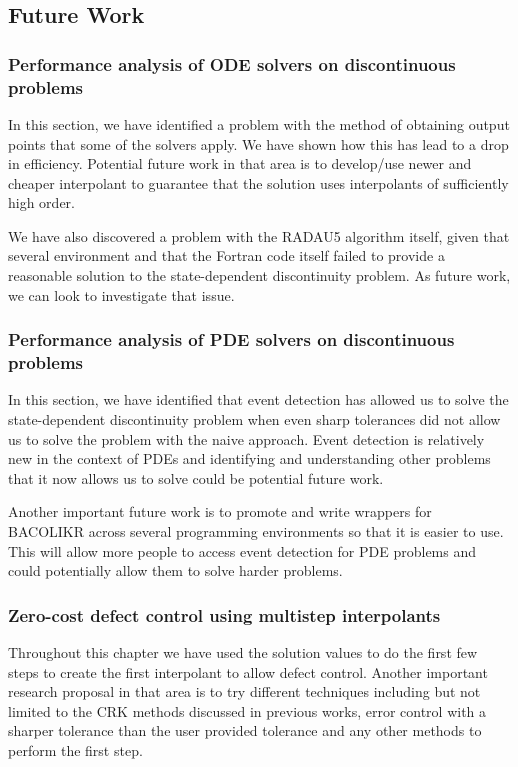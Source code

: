 \documentclass{article}
\begin{document}
\subsection{Future Work}
\subsubsection{Performance analysis of ODE solvers on discontinuous problems}
In this section, we have identified a problem with the method of obtaining output points that some of the solvers apply. We have shown how this has lead to a drop in efficiency. Potential future work in that area is to develop/use newer and cheaper interpolant to guarantee that the solution uses interpolants of sufficiently high order.

We have also discovered a problem with the RADAU5 algorithm itself, given that several environment and that the Fortran code itself failed to provide a reasonable solution to the state-dependent discontinuity problem. As future work, we can look to investigate that issue. 

\subsubsection{Performance analysis of PDE solvers on discontinuous problems}
In this section, we have identified that event detection has allowed us to solve the state-dependent discontinuity problem when even sharp tolerances did not allow us to solve the problem with the naive approach. Event detection is relatively new in the context of PDEs and identifying and understanding other problems that it now allows us to solve could be potential future work.

Another important future work is to promote and write wrappers for BACOLIKR across several programming environments so that it is easier to use. This will allow more people to access event detection for PDE problems and could potentially allow them to solve harder problems. 


\subsubsection{Zero-cost defect control using multistep interpolants}
Throughout this chapter we have used the solution values to do the first few steps to create the first interpolant to allow defect control. Another important research proposal in that area is to try different techniques including but not limited to the CRK methods discussed in previous works, error control with a sharper tolerance than the user provided tolerance and any other methods to perform the first step.
\end{document}
